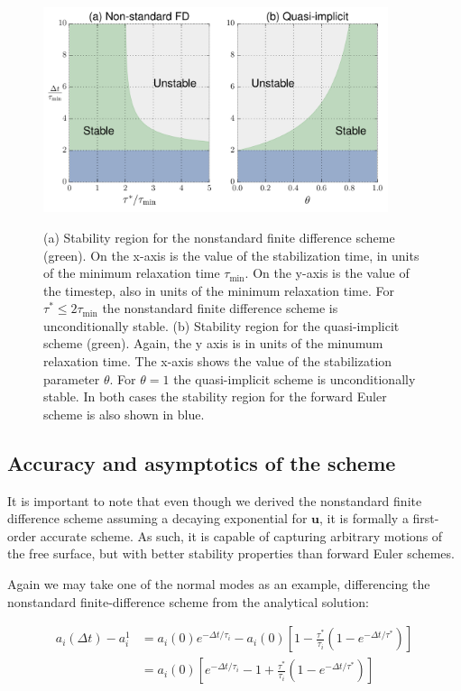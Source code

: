 \documentclass[preprint,12pt,authoryear]{elsarticle}
\begin{document}
\begin{figure}
\includegraphics[width=0.9\textwidth]{figures/stability_region.pdf}
\label{fig:stability_region}
\caption{(a) Stability region for the nonstandard finite difference scheme (green). On the x-axis is the value of the stabilization time, in units of the minimum relaxation time $\tau_{\mathrm{min}}$.  On the y-axis is the value of the timestep, also in units of the minimum relaxation time. For $\tau^*\le 2 \tau_{\mathrm{min}}$ the nonstandard finite difference scheme is unconditionally stable.  (b) Stability region for the quasi-implicit scheme (green).  Again, the y axis is in units of the minumum relaxation time.  The x-axis shows the value of the stabilization parameter $\theta$. For $\theta = 1$ the quasi-implicit scheme is unconditionally stable. In both cases the stability region for the forward Euler scheme is also shown in blue.}
\end{figure}

\subsection{Accuracy and asymptotics of the scheme}
It is important to note that even though we derived the nonstandard finite difference scheme assuming a decaying exponential
for $\mathbf{u}$, it is formally a first-order accurate scheme. As such, it is capable of capturing arbitrary motions 
of the free surface, but with better stability properties than forward Euler schemes.

Again we may take one of the normal modes as an example, differencing the nonstandard finite-difference scheme from the analytical solution:

\begin{equation}
\begin{aligned}
a_i(\Delta t) - a_i^{1} &= a_i(0) e^{-\Delta t/\tau_i} - a_i{(0)} \left[ 1 - \frac{\tau^*}{\tau_i} \left(1-e^{-\Delta t/\tau^*} \right) \right] \\
                          &= a_i{(0)} \left[ e^{-\Delta t/\tau_i} - 1 + \frac{\tau^*}{\tau_i} \left(1-e^{-\Delta t/\tau^*} \right) \right] \\
\end{aligned}
\end{equation}
\end{document}

